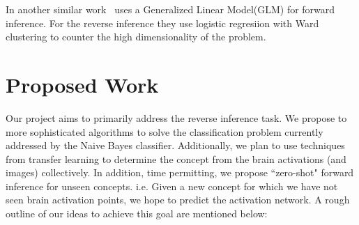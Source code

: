 \documentclass[11pt]{article}
\begin{document}
In another similar work~\cite{schwartz2013mapping} uses a Generalized Linear Model(GLM) for forward inference. For the reverse inference they use logistic regresiion with Ward clustering to counter the high dimensionality of the problem. 





\section{Proposed Work}

Our project aims to primarily address the reverse inference task. We propose to more sophisticated algorithms to solve the classification problem currently addressed by the Naive Bayes classifier. Additionally, we plan to use techniques from transfer learning to determine the concept from the brain activations (and images) collectively. In addition, time permitting, we propose ``zero-shot" forward inference for unseen concepts. i.e. Given a new concept for which we have not seen brain activation points, we hope to predict the activation network. A rough outline of our ideas to achieve this goal are mentioned below:
\end{document}
